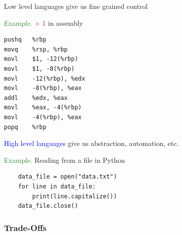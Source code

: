 \documentclass[
    xcolor={svgnames},
    hyperref={colorlinks, citecolor=DeepPink4, linkcolor=DarkRed, urlcolor=DarkBlue}
    ]{beamer}  %
\newcommand{\Eg}{\textcolor{ForestGreen}{Example. }}
\newcommand{\brown}[1]{\textcolor{Brown}{\sf #1}}
\newcommand{\blue}[1]{\textcolor{Blue}{\sf #1}}
\newcommand{\1}{\mathbbm 1}
\begin{document}
\begin{frame}[fragile]

    Low level languages give us fine grained control 
    
    \Eg \brown{1 + 1} in assembly

    {\small
    \begin{verbatim}
pushq   %rbp
movq    %rsp, %rbp
movl    $1, -12(%rbp)
movl    $1, -8(%rbp)
movl    -12(%rbp), %edx
movl    -8(%rbp), %eax
addl    %edx, %eax
movl    %eax, -4(%rbp)
movl    -4(%rbp), %eax
popq    %rbp
    \end{verbatim}
    }



\end{frame}


\begin{frame}
    
    \blue{High level languages} give us abstraction, automation, etc.

\end{frame}



\begin{frame}[fragile]

    \Eg Reading from a file in Python
    
    \begin{verbatim}
    data_file = open("data.txt")
    for line in data_file:
        print(line.capitalize()) 
    data_file.close()
    \end{verbatim}

\end{frame}



\begin{frame}
    \frametitle{Trade-Offs}

    \begin{figure}
       \begin{center}
       \end{center}
    \end{figure}

\end{frame}
\end{document}
